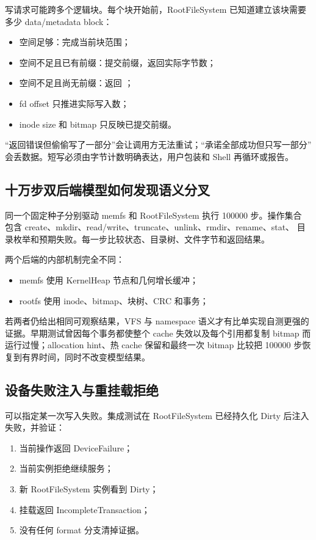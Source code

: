 写请求可能跨多个逻辑块。每个块开始前，RootFileSystem 已知道建立该块需要
多少 data/metadata block：

\begin{itemize}
  \item 空间足够：完成当前块范围；
  \item 空间不足且已有前缀：提交前缀，返回实际字节数；
  \item 空间不足且尚无前缀：返回 ；
  \item fd offset 只推进实际写入数；
  \item inode size 和 bitmap 只反映已提交前缀。
\end{itemize}

“返回错误但偷偷写了一部分”会让调用方无法重试；“承诺全部成功但只写一部分”
会丢数据。短写必须由字节计数明确表达，用户包装和 Shell 再循环或报告。

\subsection{十万步双后端模型如何发现语义分叉}

同一个固定种子分别驱动 memfs 和 RootFileSystem 执行 100000 步。操作集合
包含 create、mkdir、read/write、truncate、unlink、rmdir、rename、stat、
目录枚举和预期失败。每一步比较状态、目录树、文件字节和返回结果。

两个后端的内部机制完全不同：

\begin{itemize}
  \item memfs 使用 KernelHeap 节点和几何增长缓冲；
  \item rootfs 使用 inode、bitmap、块树、CRC 和事务；
\end{itemize}

若两者仍给出相同可观察结果，VFS 与 namespace 语义才有比单实现自测更强的
证据。早期测试曾因每个事务都使整个 cache 失效以及每个引用都复制 bitmap
而运行过慢；allocation hint、热 cache 保留和最终一次 bitmap 比较把
100000 步恢复到有界时间，同时不改变模型结果。

\subsection{设备失败注入与重挂载拒绝}

 可以指定某一次写入失败。集成测试在
RootFileSystem 已经持久化 Dirty 后注入失败，并验证：

\begin{enumerate}
  \item 当前操作返回 DeviceFailure；
  \item 当前实例拒绝继续服务；
  \item 新 RootFileSystem 实例看到 Dirty；
  \item 挂载返回 IncompleteTransaction；
  \item 没有任何 format 分支清掉证据。
\end{enumerate}

